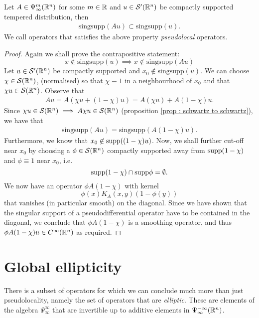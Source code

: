 \documentclass[12pt]{article}
\begin{document}
\begin{fprop}
    Let $A \in \Psi^m_\infty({\mathbb R}^n)$ for some $m \in {\ensuremath {\mathbb R}}$ and $u \in \mathcal{S}'({\mathbb R}^n)$ be compactly supported tempered distribution, then 
    \begin{align*}
        \mathrm{sing supp}(A u) \subset \mathrm{sing supp }(u). 
    \end{align*}
    We call operators that satisfies the above property \textit{pseudolocal} operators.
\end{fprop}
\begin{proof}
    Again we shall prove the contrapositive statement: 
    \[
    x \not \in \mathrm{sing supp}(u) \implies x \not \in \mathrm{sing supp}(Au)
    \]
    Let $u \in \mathcal{S}'({\mathbb R}^n)$ be compactly supported and $x_0 \not \in \mathrm{sing supp}(u)$.  We can choose $\chi \in \mathcal{S}({\mathbb R}^n)$, (normalised) so that $\chi \equiv 1$ in a neighbourhood of $x_0$ and that $\chi u \in \mathcal{S}({\mathbb R}^n)$. Observe that 
    \begin{align*}
        Au = A(\chi u + (1 - \chi)u) = A(\chi u) + A(1 - \chi)u. 
    \end{align*}
    Since $\chi u \in \mathcal{S}({\mathbb R}^n) \implies A\chi u \in \mathcal{S}({\mathbb R}^n)$ (proposition \ref{prop : schwartz to schwartz}), we have that 
    \begin{align*}
        \mathrm{singsupp}(Au) = \mathrm{singsupp}(A(1 - \chi)u). 
    \end{align*}
    Furthermore, we know that $x_0 \not \in \mathrm{supp}((1 - \chi)u)$. 
    Now, we shall further cut-off near $x_0$ by choosing a $\phi \in \mathcal{S}({\mathbb R}^n)$ compactly supported  away from $\mathrm{supp}(1 - \chi)$ and $\phi \equiv 1$ near $x_0$, i.e. 
    \[
    \mathrm{supp}(1 - \chi) \cap \mathrm{supp} \phi = \emptyset. 
    \]
    We now have an operator $\phi A(1 - \chi) $ with kernel
    \[
    \phi(x) K_A(x, y) ( 1 - \phi(y))
    \]
    that vanishes (in particular smooth) on the diagonal. Since we have shown that the singular support of a pseudodifferential operator have to be contained in the diagonal, we conclude that $\phi A(1 - \chi)$ is a smoothing operator, and thus $\phi A (1 - \chi) u \in C^\infty({\mathbb R}^n)$ as required. 
    
\end{proof}


\section{Global ellipticity} 
There is a subset of operators for which we can conclude much more than just pseudolocality, namely the set of operators that are \textit{elliptic}. These are elements of the algebra $\Psi^{\infty}_{\infty}$ that are invertible up to additive elements in $\Psi^{-\infty}_{\infty}({\mathbb R}^n)$. 
\end{document}
